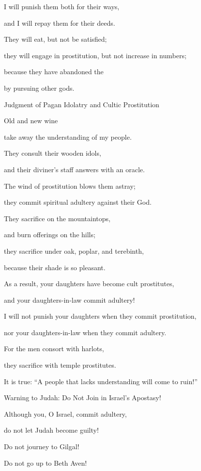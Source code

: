 {\par }{\Q I will punish
them both for their ways,
\par }{\Q and I will repay
them for their deeds.
\par }{\Q {}They will eat,
but not
be satisfied;
\par }{\Q they will engage in prostitution,
but not
increase in numbers;
\par }{\Q because
they have abandoned
the {}
\par }{\Q by pursuing other gods.
\par }{\SH Judgment of Pagan Idolatry and Cultic Prostitution
\par }{\Q {}Old
and new wine
\par }{\Q take away
the understanding of my people.
\par }{\Q {}They consult their wooden
idols,
\par }{\Q and their diviner’s
staff
answers
with an oracle.
\par }{\Q The wind
of prostitution
blows them astray;
\par }{\Q they commit spiritual
adultery
against their God.
\par }{\Q {}They sacrifice
on
the mountaintops,
\par }{\Q and burn offerings
on
the hills;
\par }{\Q they sacrifice under
oak,
poplar,
and terebinth,
\par }{\Q because
their shade
is so pleasant.
\par }{\Q As a result,
your daughters
have become cult prostitutes,
\par }{\Q and your daughters-in-law
commit adultery!
\par }{\Q {}I will not
punish
your daughters
when
they commit prostitution,
\par }{\Q nor your daughters-in-law
when
they commit adultery.
\par }{\Q For
the men
consort
with
harlots,
\par }{\Q they sacrifice
with
temple prostitutes.
\par }{\Q It is true: “A people
that lacks
understanding
will come to ruin!”
\par }{\SH Warning to Judah: Do Not Join in Israel’s Apostasy!
\par }{\Q {}Although
you,
O Israel,
commit adultery,
\par }{\Q do not
let Judah
become guilty!
\par }{\Q Do not
journey
to Gilgal!
\par }{\Q Do not
go up
to Beth Aven!

}
